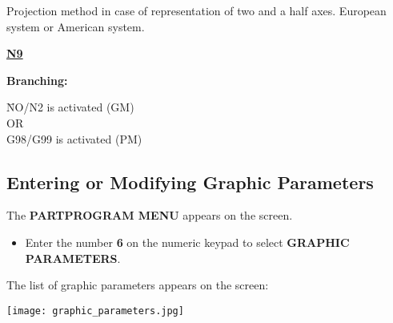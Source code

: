 Projection method in case of representation of two and a half axes.  
European system or American system.

\underline{\textbf{N9}}

\textbf{Branching:}
\begin{tabbing}
    \hspace{1cm} \= NO/N2 is activated (GM) \\
    \> OR \\
    \> G98/G99 is activated (PM)
\end{tabbing}

\newpage
\subsection{Entering or Modifying Graphic Parameters}

\procedure

\begin{itemize}
\end{itemize}

\vspace{.5cm}

\begin{itemize}
\end{itemize}

\vspace{.5cm}

\begin{itemize}
\end{itemize}

\vspace{.5cm}

The \textbf{PARTPROGRAM MENU} appears on the screen.

\begin{itemize}
    \item Enter the number \textbf{6} on the numeric keypad to select \textbf{GRAPHIC PARAMETERS}.
\end{itemize}

The list of graphic parameters appears on the screen:

\begin{center}
    \texttt{[image: graphic\_parameters.jpg]}
\end{center}

\begin{itemize}
\end{itemize}

